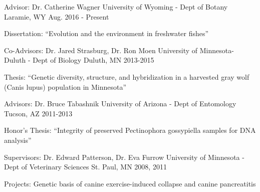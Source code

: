 

\begin{cventries}

  \cventry
    {Advisor: Dr. Catherine Wagner} %
    {University of Wyoming - Dept of Botany} %
    {Laramie, WY} %
    {Aug. 2016 - Present} %
    {
      \begin{cvitems} %
        \item {Dissertation: ``Evolution and the environment in freshwater fishes”}
      \end{cvitems}
    }

  \cventry
    {Co-Advisors: Dr. Jared Strasburg, Dr. Ron Moen} %
    {University of Minnesota- Duluth - Dept of Biology} %
    {Duluth, MN} %
    {2013-2015} %
    {
      \begin{cvitems} %
        \item {Thesis: ``Genetic diversity, structure, and hybridization in a harvested gray wolf (Canis lupus) population in Minnesota” }
      \end{cvitems}
    }

  \cventry
    {Advisors: Dr. Bruce Tabashnik} %
    {University of Arizona - Dept of Entomology} %
    {Tucson, AZ} %
    {2011-2013} %
    {
      \begin{cvitems} %
        \item {Honor's Thesis: ``Integrity of preserved Pectinophora gossypiella samples for DNA analysis” }
      \end{cvitems}
    }

  \cventry
    {Supervisors: Dr. Edward Patterson, Dr. Eva Furrow} %
    {University of Minnesota - Dept of Veterinary Sciences} %
    {St. Paul, MN} %
    {2008, 2011} %
    {
      \begin{cvitems} %
        \item {Projects: Genetic basis of canine exercise-induced collapse and canine pancreatitis}
      \end{cvitems}
    }

\end{cventries}
